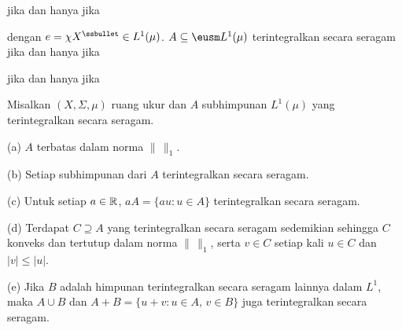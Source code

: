 
\noindent jika dan hanya jika


\noindent dengan $e=\chi X^{\ssbullet}\in L^1(\mu)$.
 $A\subseteq\eusm L^1(\mu)$ terintegralkan secara seragam jika dan hanya jika


\noindent jika dan hanya jika



 Misalkan $(X,\Sigma,\mu)$ ruang ukur dan $A$
subhimpunan $L^1(\mu)$ yang terintegralkan secara seragam.

(a) $A$ terbatas dalam norma $\|\,\|_1$.

(b) Setiap subhimpunan dari $A$ terintegralkan secara seragam.

(c) Untuk setiap $a\in\Bbb R$, $aA=\{au:u\in A\}$ terintegralkan secara seragam.

(d) Terdapat $C\supseteq A$ yang terintegralkan secara seragam sedemikian
sehingga $C$ konveks dan tertutup dalam norma $\|\,\|_1$, serta $v\in C$
setiap kali $u\in C$ dan
$|v|\le|u|$.

(e) Jika $B$ adalah himpunan terintegralkan secara seragam lainnya dalam
$L^1$, maka $A\cup B$ dan $A+B=\{u+v:u\in A,\,v\in B\}$ juga terintegralkan
secara seragam.


